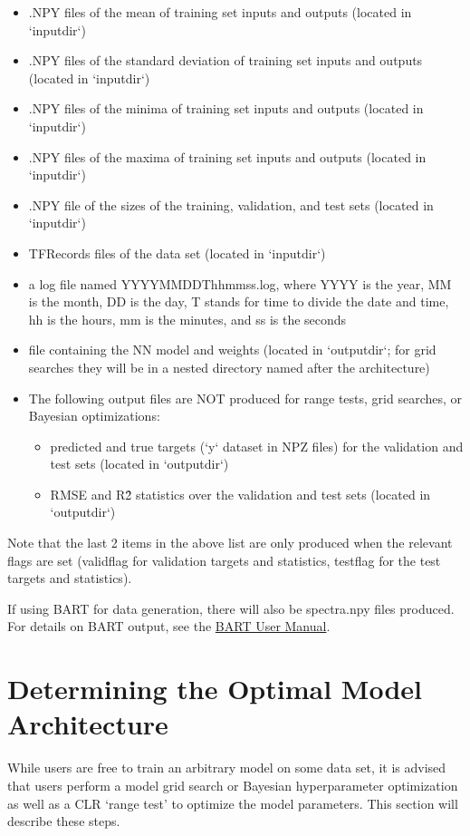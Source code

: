 \documentclass[letterpaper, 12pt]{article}
\begin{document}
\begin{itemize}
  \item .NPY files of the mean of training set inputs and outputs (located in `inputdir`)
  \item .NPY files of the standard deviation of training set inputs and outputs (located in `inputdir`)
  \item .NPY files of the minima of training set inputs and outputs (located in `inputdir`)
  \item .NPY files of the maxima of training set inputs and outputs (located in `inputdir`)
  \item .NPY file of the sizes of the training, validation, and test sets (located in `inputdir`)
  \item TFRecords files of the data set (located in `inputdir`)
  \item a log file named YYYYMMDDThhmmss.log, where YYYY is the year, MM is the month, DD is the day, T stands for time to divide the date and time, hh is the hours, mm is the minutes, and ss is the seconds
  \item file containing the NN model and weights (located in `outputdir`; for grid searches they will be in a nested directory named after the architecture)
  \item The following output files are NOT produced for range tests, grid searches, or Bayesian optimizations:
  \begin{itemize}
    \item predicted and true targets (`y` dataset in NPZ files) for the validation and test sets (located in `outputdir`)
    \item RMSE and R\^2 statistics over the validation and test sets (located in `outputdir`)
  \end{itemize}
\end{itemize}

\noindent Note that the last 2 items in the above list are only produced when 
the relevant flags are set (validflag for validation targets and statistics, 
testflag for the test targets and statistics).

\noindent If using BART for data generation, there will also be spectra.npy files produced.  For details on BART output, see the \href{https://exosports.github.io/BART/doc/BART_User_Manual.html}{BART User Manual}.

\section{Determining the Optimal Model Architecture}
\label{sec:optarch}
While users are free to train an arbitrary model on some data set, it is 
advised that users perform a model grid search or Bayesian hyperparameter 
optimization as well as a CLR `range test' to optimize the model parameters.  
This section will describe these steps.
\end{document}
